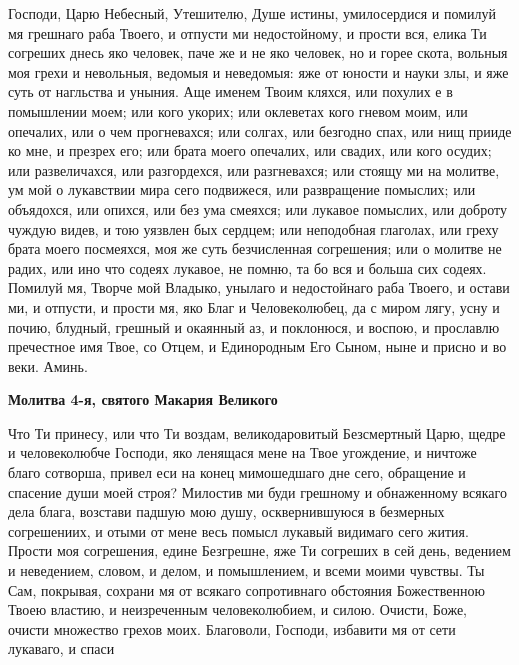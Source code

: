    Господи, Царю Небесный, Утешителю, Душе истины, умилосердися и
помилуй мя грешнаго раба Твоего, и отпусти ми недостойному, и прости вся,
елика Ти согреших днесь яко человек, паче же и не яко человек, но и горее
скота, вольныя моя грехи и невольныя, ведомыя и неведомыя: яже от юности
и науки злы, и яже суть от нагльства и уныния. Аще именем Твоим кляхся,
или похулих е в помышлении моем; или кого укорих; или оклеветах кого
гневом моим, или опечалих, или о чем прогневахся; или солгах, или безгодно
спах, или нищ прииде ко мне, и презрех его; или брата моего опечалих, или
свадих, или кого осудих; или развеличахся, или разгордехся, или
разгневахся; или стоящу ми на молитве, ум мой о лукавствии мира сего
подвижеся, или развращение помыслих; или объядохся, или опихся,
или без ума смеяхся; или лукавое помыслих, или доброту чуждую
видев, и тою уязвлен бых сердцем; или неподобная глаголах, или греху
брата моего посмеяхся, моя же суть безчисленная согрешения; или о
молитве не радих, или ино что содеях лукавое, не помню, та бо вся и
больша сих содеях. Помилуй мя, Творче мой Владыко, унылаго и
недостойнаго раба Твоего, и остави ми, и отпусти, и прости мя, яко Благ и
Человеколюбец, да с миром лягу, усну и почию, блудный, грешный и
окаянный аз, и поклонюся, и воспою, и прославлю пречестное имя
Твое, со Отцем, и Единородным Его Сыном, ныне и присно и во веки.
Аминь.



 

\bfseries Молитва 4-я, святого Макария Великого\normalfont{}


   Что Ти принесу, или что Ти воздам, великодаровитый Безсмертный
Царю, щедре и человеколюбче Господи, яко ленящася мене на Твое
угождение, и ничтоже благо сотворша, привел еси на конец мимошедшаго
дне сего, обращение и спасение души моей строя? Милостив ми буди
грешному и обнаженному всякаго дела блага, возстави падшую мою душу,
осквернившуюся в безмерных согрешениих, и отыми от мене весь помысл
лукавый видимаго сего жития. Прости моя согрешения, едине Безгрешне,
яже Ти согреших в сей день, ведением и неведением, словом, и делом, и
помышлением, и всеми моими чувствы. Ты Сам, покрывая, сохрани мя от
всякаго сопротивнаго обстояния Божественною Твоею властию, и
неизреченным человеколюбием, и силою. Очисти, Боже, очисти множество
грехов моих. Благоволи, Господи, избавити мя от сети лукаваго, и спаси

